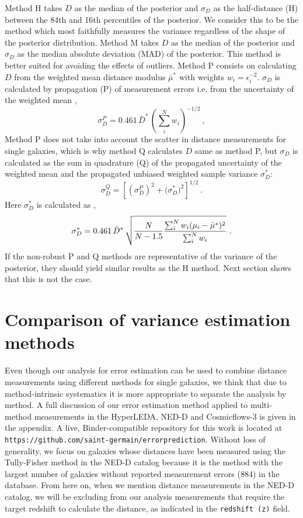 \documentclass[a4paper,fleqn,usenatbib]{mnras}
\begin{document}
Method H takes $D$ as the median of the posterior and $\sigma_D$ as the half-distance (H) between the 84th and 16th percentiles of the posterior. We consider this to be the method which most faithfully measures the variance regardless of the shape of the posterior distribution. Method M takes $D$ as the median of the posterior and $\sigma_D$ as the median absolute deviation (MAD) of the posterior. This method is better suited for avoiding the effects of outliers. Method P consists on calculating $D$ from the weighted mean distance modulus $\bar{\mu}^*$ with weights $w_i=\epsilon_i^{-2}$. $\sigma_D$ is calculated by propagation (P) of measurement errors  i.e. from the uncertainty of the weighted mean \citep{cosmicflows},
\begin{equation}
\sigma_D^P=0.461\,\bar{D}^*\,\left(\sum_i^Nw_i\right)^{-1/2} \ ,
\end{equation}
Method P does not take into account the scatter in distance measurements for single galaxies, which is why method Q calculates $D$ same as method P, but $\sigma_D$ is calculated as the sum in quadrature (Q) of the propagated uncertainty of the weighted mean and the propagated unbiased weighted sample variance $\sigma_D^*$:
\begin{equation}
\sigma_D^Q=\left[ \left(\sigma_D^P\right)^2+\Big(\sigma_D^*\Big)^2\right]^{1/2} \ .
\end{equation}
Here $\sigma^*_D$ is calculated as  \citep{wstdev},
\begin{equation}
\sigma^*_D=0.461\,\bar{D}^*\,\sqrt{\frac{N}{N-1.5}\frac{\sum_i^Nw_i(\mu_i-\bar{\mu}^*)^2}{\sum_i^Nw_i}\vphantom{\Biggl(}}\ .
\end{equation}
If the non-robust P and Q methods are representative of the variance of the posterior, they should yield similar results as the H method. Next section shows that this is not the case.

\section{Comparison of variance estimation methods}
\label{sec:comp} 


Even though our analysis for error estimation can be used to combine distance measurements using different methods for single galaxies, we think that due to method-intrinsic systematics it is more appropriate to separate the analysis by method. A full discussion of our error estimation method applied to multi-method measurements in the HyperLEDA, NED-D and Cosmicflows-3 is given in the appendix. A live, Binder-compatible repository for this work is located at \texttt{https://github.com/saint-germain/errorprediction}. Without loss of generality, we focus on galaxies whose distances have been measured using the Tully-Fisher method in the NED-D catalog because it is the method with the largest number of galaxies without reported measurement errors (884) in the database. From here on, when we mention distance measurements in the NED-D catalog, we will be excluding from our analysis measurements that require the target redshift to calculate the distance, as indicated in the \texttt{redshift (z)} field. \\
\end{document}
